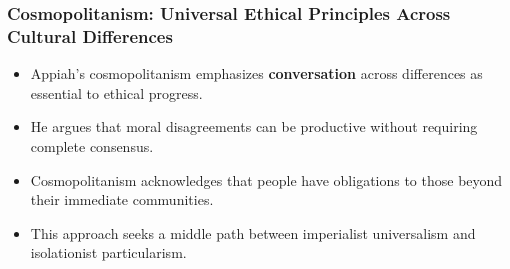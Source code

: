 \documentclass{beamer}
\begin{document}
	\begin{frame}
		\frametitle{Cosmopolitanism: Universal Ethical Principles Across Cultural Differences}
		
		\begin{itemize}
			\item Appiah's cosmopolitanism emphasizes \textbf{conversation} across differences as essential to ethical progress.
			\item He argues that moral disagreements can be productive without requiring complete consensus.
			\item Cosmopolitanism acknowledges that people have obligations to those beyond their immediate communities.
			\item This approach seeks a middle path between imperialist universalism and isolationist particularism.
		\end{itemize}
		
		\begin{center}
		\end{center}
		
	\end{frame}
	
\end{document}
